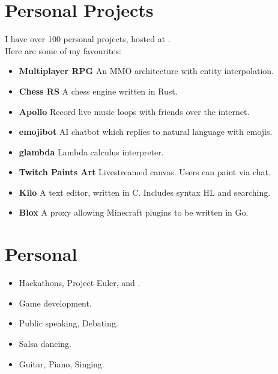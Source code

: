 \documentclass{jcgcv}
\begin{document}
\begin{column}
  \section{Personal Projects}
  I have over 100 personal projects, hosted at
  .\\
  Here are some of my favourites:
  \begin{itemize}
    \item \textbf{Multiplayer RPG} An MMO architecture with entity interpolation.
    \item \textbf{Chess RS} A chess engine written in Rust.
    \item \textbf{Apollo} Record live music loops with friends over the internet.
    \item \textbf{emojibot} AI chatbot which replies to natural language with emojis.
    \item \textbf{glambda} Lambda calculus interpreter.
    \item \textbf{Twitch Paints Art} Livestreamed canvas. Users can paint via chat.
    \item \textbf{Kilo} A text editor, written in C. Includes syntax HL and searching.
    \item \textbf{Blox} A proxy allowing Minecraft plugins to be written in Go.
  \end{itemize}

  \section{Personal}
  \begin{itemize}
    \item Hackathons, Project Euler, and .
    \item Game development.
    \item Public speaking, Debating.
    \item Salsa dancing.
    \item Guitar, Piano, Singing.
  \end{itemize}

\end{column}
\end{document}
